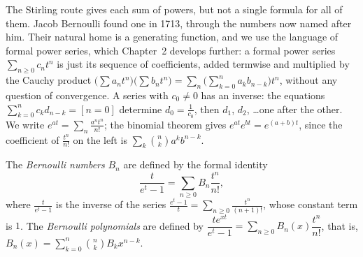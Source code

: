 The Stirling route gives each sum of powers, but not a single formula for all of them. Jacob Bernoulli found one in
1713, through the numbers now named after him. Their natural home is a generating function, and we use the language
of formal power series, which Chapter~2 develops further: a formal power series $\sum_{n\ge0}c_nt^n$ is just its
sequence of coefficients, added termwise and multiplied by the Cauchy product
$\bigl(\sum a_nt^n\bigr)\bigl(\sum b_nt^n\bigr)=\sum_n\bigl(\sum_{k=0}^na_kb_{n-k}\bigr)t^n$, without any question of
convergence. A series with $c_0\ne0$ has an inverse: the equations $\sum_{k=0}^nc_kd_{n-k}=[n=0]$ determine $d_0=\frac1{c_0}$,
then $d_1$, $d_2$, \dots one after the other. We write $e^{at}=\sum_n\frac{a^nt^n}{n!}$; the binomial theorem gives
$e^{at}e^{bt}=e^{(a+b)t}$, since the coefficient of $\frac{t^n}{n!}$ on the left is $\sum_k\binom nka^kb^{n-k}$.

\begin{definition}
The \emph{Bernoulli numbers} $B_n$ are defined by the formal identity
\[
\frac t{e^t-1}=\sum_{n\ge0}B_n\frac{t^n}{n!},
\]
where $\frac t{e^t-1}$ is the inverse of the series $\frac{e^t-1}t=\sum_{n\ge0}\frac{t^n}{(n+1)!}$, whose constant term is $1$.
The \emph{Bernoulli polynomials} are defined by $\dfrac{te^{xt}}{e^t-1}=\sum_{n\ge0}B_n(x)\dfrac{t^n}{n!}$, that is,
$B_n(x)=\sum_{k=0}^n\binom nkB_kx^{n-k}$.
\end{definition}

